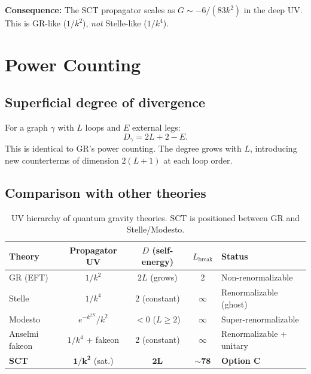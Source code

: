\documentclass[12pt,a4paper]{article}
\begin{document}
\textbf{Consequence:} The SCT propagator scales as $G \sim -6/(83k^2)$
in the deep UV. This is GR-like ($1/k^2$), \emph{not} Stelle-like ($1/k^4$).

\section{Power Counting}
\label{sec:power-counting}

\subsection{Superficial degree of divergence}

For a graph $\gamma$ with $L$ loops and $E$ external legs:
\begin{equation}\label{eq:D}
  D_\gamma = 2L + 2 - E.
\end{equation}
This is identical to GR's power counting. The degree grows with $L$,
introducing new counterterms of dimension $2(L+1)$ at each loop order.

\subsection{Comparison with other theories}

\begin{table}[H]
\centering
\begin{tabular}{lcccl}
\toprule
Theory & Propagator UV & $D$ (self-energy) & $L_{\mathrm{break}}$ & Status \\
\midrule
GR (EFT) & $1/k^2$ & $2L$ (grows) & 2 & Non-renormalizable \\
Stelle & $1/k^4$ & 2 (constant) & $\infty$ & Renormalizable (ghost) \\
Modesto & $e^{-k^{2N}}/k^2$ & $< 0$ ($L \geq 2$) & $\infty$ & Super-renormalizable \\
Anselmi fakeon & $1/k^4$ + fakeon & 2 (constant) & $\infty$ & Renormalizable + unitary \\
\textbf{SCT} & $\mathbf{1/k^2}$ (sat.) & $\mathbf{2L}$ & $\mathbf{\sim 78}$ & \textbf{Option C} \\
\bottomrule
\end{tabular}
\caption{UV hierarchy of quantum gravity theories. SCT is positioned between GR and Stelle/Modesto.}
\label{tab:comparison}
\end{table}
\end{document}
